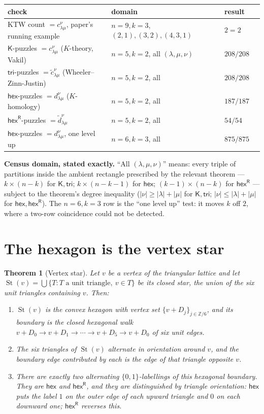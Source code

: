 \documentclass[11pt]{article}
\newtheorem{theorem}{Theorem}
\theoremstyle{definition}
\newcommand{\hex}{\mathsf{hex}}
\newcommand{\hexR}{\mathsf{hex}^{\mathsf{R}}}
\newcommand{\Ktile}{\mathsf{K}}
\newcommand{\tritile}{\mathsf{tri}}
\newcommand{\la}{\lambda}
\newcommand{\Star}{\operatorname{St}}
\newcommand{\cc}{c^{\nu}_{\la\mu}}
\newcommand{\dd}{d^{\nu}_{\la\mu}}
\begin{document}
\begin{center}\small
\begin{tabular}{lllr}
\hline
check & domain & result \\
\hline
KTW count $=\cc$, paper's running example & $n{=}9,k{=}3$, $(2,1),(3,2),(4,3,1)$ & $2=2$ \\
$\Ktile$-puzzles $=\cc$ ($K$-theory, Vakil) & $n{=}5,k{=}2$, all $(\la,\mu,\nu)$ & $208/208$ \\
$\tritile$-puzzles $=\tilde c^\nu_{\la\mu}$ (Wheeler--Zinn-Justin) & $n{=}5,k{=}2$, all & $208/208$ \\
$\hex$-puzzles $=\dd$ ($K$-homology) & $n{=}5,k{=}2$, all & $187/187$ \\
$\hexR$-puzzles $=\tilde d^\nu_{\la\mu}$ & $n{=}5,k{=}2$, all & $54/54$ \\
$\hex$-puzzles $=\dd$, one level up & $n{=}6,k{=}3$, all & $875/875$ \\
\hline
\end{tabular}
\end{center}

\noindent
\textbf{Census domain, stated exactly.} ``All $(\la,\mu,\nu)$'' means: every
triple of partitions inside the ambient rectangle prescribed by the relevant
theorem --- $k\times(n-k)$ for $\Ktile,\tritile$; $k\times(n-k-1)$ for $\hex$;
$(k-1)\times(n-k)$ for $\hexR$ --- subject to the theorem's degree inequality
($|\nu|\ge|\la|+|\mu|$ for $\Ktile,\tritile$; $|\nu|\le|\la|+|\mu|$ for
$\hex,\hexR$). The $n=6,k=3$ row is the ``one level up'' test: it moves $k$ off
$2$, where a two-row coincidence could not be detected.

\section{The hexagon is the vertex star}\label{sec:star}

\begin{theorem}[Vertex star]\label{thm:star}
Let $v$ be a vertex of the triangular lattice and let
$\Star(v)=\bigcup\{T : T \text{ a unit triangle},\ v\in T\}$ be its closed star,
the union of the six unit triangles containing $v$. Then:
\begin{enumerate}
\item[(i)] $\Star(v)$ is the convex hexagon with vertex set
$\{v+D_j\}_{j\in\mathbb{Z}/6}$, and its boundary is the closed hexagonal walk
$v+D_0 \to v+D_1 \to \cdots \to v+D_5 \to v+D_0$ of six unit edges.
\item[(ii)] The six triangles of $\Star(v)$ alternate in orientation around
$v$, and the boundary edge contributed by each is the edge of that triangle
opposite $v$.
\item[(iii)] There are exactly two alternating $\{0,1\}$-labellings of this
hexagonal boundary. They are $\hex$ and $\hexR$, and they are distinguished by
triangle orientation: $\hex$ puts the label $1$ on the outer edge of each
\emph{upward} triangle and $0$ on each \emph{downward} one; $\hexR$ reverses
this.
\end{enumerate}
\end{theorem}
\end{document}
